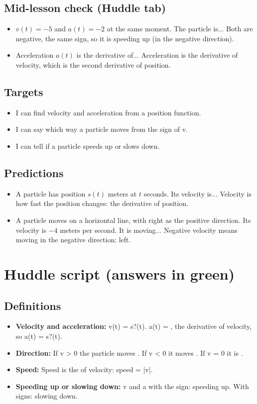 \documentclass[11pt]{article}
\begin{document}
\subsection*{Mid-lesson check (Huddle tab)}\begin{itemize}
\item $v(t)=-5$ and $a(t)=-2$ at the same moment. The particle is...  Both are negative, the same sign, so it is speeding up (in the negative direction).
\item Acceleration $a(t)$ is the derivative of...  Acceleration is the derivative of velocity, which is the second derivative of position.
\end{itemize}
\subsection*{Targets}\begin{itemize}\item I can find velocity and acceleration from a position function.
\item I can say which way a particle moves from the sign of v.
\item I can tell if a particle speeds up or slows down.\end{itemize}
\subsection*{Predictions}\begin{itemize}
\item A particle has position $s(t)$ meters at $t$ seconds. Its velocity is...  Velocity is how fast the position changes: the derivative of position.
\item A particle moves on a horizontal line, with right as the positive direction. Its velocity is $-4$ meters per second. It is moving...  Negative velocity means moving in the negative direction: left.
\end{itemize}
\section*{Huddle script (answers in green)}
\subsection*{Definitions}\begin{itemize}
\item \textbf{Velocity and acceleration:} v(t) = s?(t). a(t) = , the derivative of velocity, so a(t) = s?(t).
\item \textbf{Direction:} If v > 0 the particle moves . If v < 0 it moves . If v = 0 it is .
\item \textbf{Speed:} Speed is the  of velocity: speed = |v|.
\item \textbf{Speeding up or slowing down:} v and a with the  sign: speeding up. With  signs: slowing down.
\end{itemize}
\end{document}
